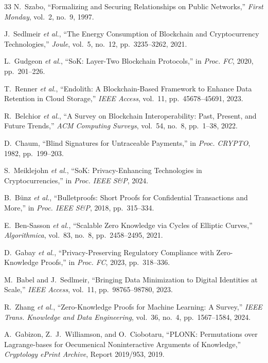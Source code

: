 \documentclass[conference]{IEEEtran}
\begin{document}
\begin{thebibliography}{33}
N.~Szabo, ``Formalizing and Securing Relationships on Public Networks,''
\textit{First Monday}, vol.~2, no.~9, 1997.

J.~Sedlmeir {\em et al.}, ``The Energy Consumption of Blockchain and
Cryptocurrency Technologies,'' \textit{Joule}, vol.~5, no.~12,
pp.~3235--3262, 2021.

L.~Gudgeon {\em et al.}, ``SoK: Layer-Two Blockchain Protocols,'' in
\textit{Proc. FC}, 2020, pp.~201--226.

T.~Renner {\em et al.}, ``Endolith: A Blockchain-Based Framework to Enhance
Data Retention in Cloud Storage,'' \textit{IEEE Access}, vol.~11,
pp.~45678--45691, 2023.

R.~Belchior {\em et al.}, ``A Survey on Blockchain Interoperability: Past,
Present, and Future Trends,''
\textit{ACM Computing Surveys}, vol.~54, no.~8, pp.~1--38, 2022.

D.~Chaum, ``Blind Signatures for Untraceable Payments,'' in \textit{Proc.
CRYPTO}, 1982, pp.~199--203.

S.~Meiklejohn {\em et al.}, ``SoK: Privacy-Enhancing Technologies in
Cryptocurrencies,'' in \textit{Proc. IEEE S\&P}, 2024.

B.~B\"{u}nz {\em et al.}, ``Bulletproofs: Short Proofs for Confidential
Transactions and More,'' in \textit{Proc. IEEE S\&P}, 2018, pp.~315--334.

E.~Ben-Sasson {\em et al.}, ``Scalable Zero Knowledge via Cycles of Elliptic
Curves,'' \textit{Algorithmica}, vol.~83, no.~8, pp.~2458--2495, 2021.

D.~Gabay {\em et al.}, ``Privacy-Preserving Regulatory Compliance with
Zero-Knowledge Proofs,'' in \textit{Proc. FC}, 2023, pp.~318--336.

M.~Babel and J.~Sedlmeir, ``Bringing Data Minimization to Digital Identities
at Scale,'' \textit{IEEE Access}, vol.~11, pp.~98765--98780, 2023.

R.~Zhang {\em et al.}, ``Zero-Knowledge Proofs for Machine Learning: A
Survey,'' \textit{IEEE Trans. Knowledge and Data Engineering}, vol.~36, no.~4,
pp.~1567--1584, 2024.

A.~Gabizon, Z.~J.~Williamson, and O.~Ciobotaru, ``PLONK: Permutations over
Lagrange-bases for Oecumenical Noninteractive Arguments of Knowledge,''
\textit{Cryptology ePrint Archive}, Report 2019/953, 2019.


\end{thebibliography}
\end{document}
